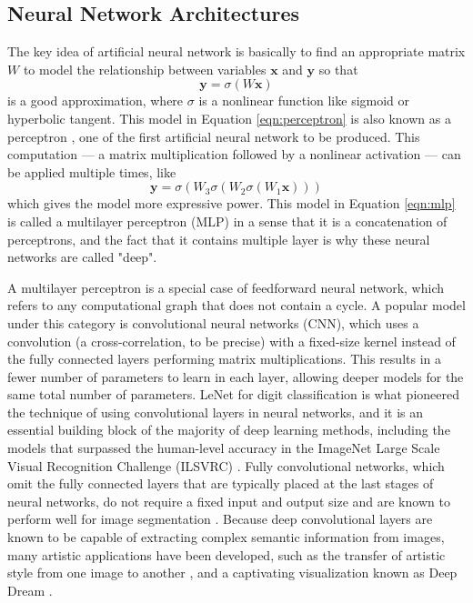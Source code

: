 \subsection{Neural Network Architectures}

The key idea of artificial neural network is basically to find an appropriate matrix $W$ to model the relationship between variables $\mathbf{x}$ and $\mathbf{y}$ so that
\begin{equation}\label{eqn:perceptron}
	\mathbf{y} = \sigma(W \mathbf{x})
\end{equation}
is a good approximation, where $\sigma$ is a nonlinear function like sigmoid or hyperbolic tangent. This model in Equation \ref{eqn:perceptron} is also known as a perceptron \cite{rosenblatt1957perceptron}, one of the first artificial neural network to be produced.
This computation --- a matrix multiplication followed by a nonlinear activation --- can be applied multiple times, like
\begin{equation}\label{eqn:mlp}
	\mathbf{y} = \sigma(W_3\sigma(W_2 \sigma(W_1 \mathbf{x})))
\end{equation}
which gives the model more expressive power.
This model in Equation \ref{eqn:mlp} is called a multilayer perceptron (MLP) in a sense that it is a concatenation of perceptrons, and the fact that it contains multiple layer is why these neural networks are called "deep".

A multilayer perceptron is a special case of feedforward neural network, which refers to any computational graph that does not contain a cycle. A popular model under this category is convolutional neural networks (CNN), which uses a convolution (a cross-correlation, to be precise) with a fixed-size kernel instead of the fully connected layers performing matrix multiplications.
This results in a fewer number of parameters to learn in each layer, allowing deeper models for the same total number of parameters.
LeNet \cite{lecun1995lenet} for digit classification is what pioneered the technique of using convolutional layers in neural networks, and it is an essential building block of the majority of deep learning methods, including the models that surpassed the human-level accuracy in the ImageNet Large Scale Visual Recognition Challenge (ILSVRC) \cite{krizhevsky2012imagenet, simonyan2014vgg, szegedy2015googlenet, he2016resnet}.
Fully convolutional networks, which omit the fully connected layers that are typically placed at the last stages of neural networks, do not require a fixed input and output size and are known to perform well for image segmentation \cite{long2015fully}.
Because deep convolutional layers are known to be capable of extracting complex semantic information from images, many artistic applications have been developed, such as the transfer of artistic style from one image to another \cite{gatys2015style}, and a captivating visualization known as Deep Dream \cite{mahendran2016deepdream}.


